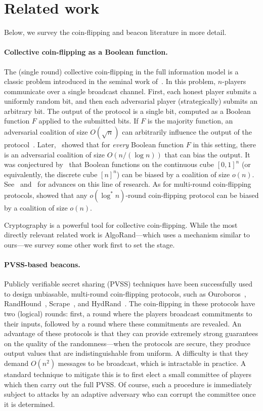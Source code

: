 \section{Related work}\label{sec:related-work}


Below, we survey the coin-flipping and beacon literature in more detail.

\paragraph{Collective coin-flipping as a Boolean function.} 
The (single round) collective coin-flipping in the full information
model is a classic problem introduced in the seminal work
of~\citet{BL85}.  In this problem, $n$-players communicate over a
single broadcast channel.  First, each honest player submits a
uniformly random bit, and then each adversarial player (strategically)
submits an arbitrary bit.  The output of the protocol is a single bit,
computed as a Boolean function $F$ applied to the submitted bits.  If
$F$ is the majority function, an adversarial coalition of size
$O(\sqrt{n})$ can arbitrarily influence the output of the
protocol~\cite{BL85}.  Later,~\citet*{KKL} showed that for
\emph{every} Boolean function $F$ in this setting, there is an
adversarial coalition of size $O(n/(\log n))$ that can bias the
output.  It was conjectured by~\citet{Friedgut} that Boolean functions
on the continuous cube $[0,1]^n$ (or equivalently, the discrete cube
$[n]^n$) can be biased by a coalition of size $o(n)$.
See~\cite{Hatami} and~\cite{Kalai} for advances on this line of
research.  As for multi-round coin-flipping protocols, \citet*{RSZ}
showed that any $o(\log^* n)$-round coin-flipping protocol can be
biased by a coalition of size $o(n)$.

Cryptography is a powerful tool for collective coin-flipping. While the most directly relevant related work is AlgoRand---which uses a mechanism similar to ours---we survey some other work first to set the stage. 

\paragraph{PVSS-based beacons.} 
Publicly verifiable secret sharing (PVSS) techniques have been
successfully used to design unbiasable, multi-round coin-flipping
protocols, such as Ouroboros~\cite{Ouroboros},
RandHound~\cite{RandHound}, Scrape~\cite{Scrape}, and
HydRand~\cite{HydRand}.  The coin-flipping in these protocols have two
(logical) rounds: first, a round where the players broadcast
commitments to their inputs, followed by a round where these
commitments are revealed. An advantage of these protocols is that they
can provide extremely strong guarantees on the quality of the
randomness---when the protocols are secure, they produce output values
that are indistinguishable from uniform. A difficulty is that they
demand $O(n^2)$ messages to be broadcast, which is intractable in
practice. A standard technique to mitigate this is to first elect a small
committee of players which then carry out the full PVSS. Of course,
such a procedure is immediately subject to attacks by an adaptive
adversary who can corrupt the committee once it is determined.

